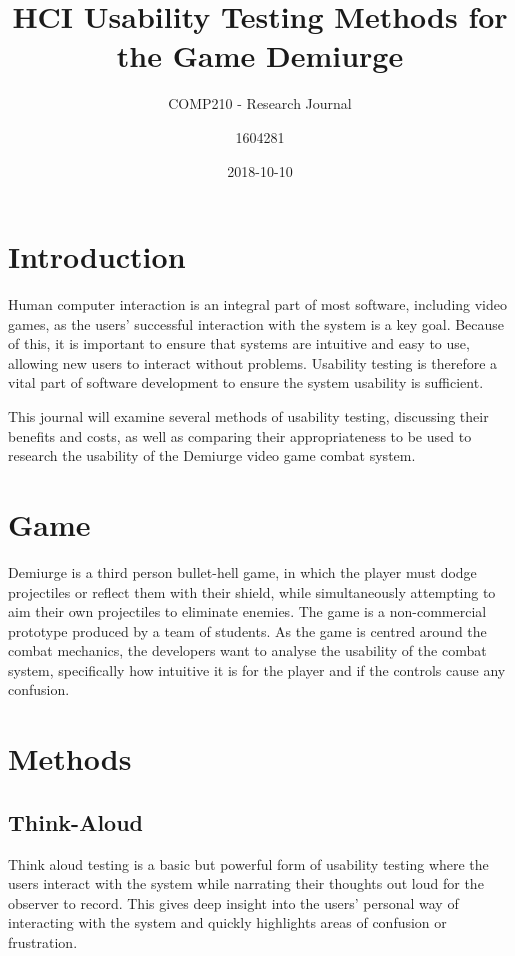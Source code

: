 \documentclass{scrartcl}
\title{HCI Usability Testing Methods for the Game Demiurge}
\subtitle{COMP210 - Research Journal}
\date{2018-10-10}
\author{1604281}
\begin{document}
\maketitle
{}


\section{Introduction}
Human computer interaction is an integral part of most software, including video games, as the users' successful interaction with the system is a key goal. Because of this, it is important to ensure that systems are intuitive and easy to use, allowing new users to interact without problems. Usability testing is therefore a vital part of software development to ensure the system usability is sufficient. 

This journal will examine several methods of usability testing, discussing their benefits and costs, as well as comparing their appropriateness to be used to research the usability of the Demiurge video game combat system.

\section{Game}
Demiurge is a third person bullet-hell game, in which the player must dodge projectiles or reflect them with their shield, while simultaneously attempting to aim their own projectiles to eliminate enemies. The game is a non-commercial prototype produced by a team of students. As the game is centred around the combat mechanics, the developers want to analyse the usability of the combat system, specifically how intuitive it is for the player and if the controls cause any confusion.


\section{Methods}

\subsection{Think-Aloud}
Think aloud testing is a basic but powerful form of usability testing where the users interact with the system while narrating their thoughts out loud for the observer to record. \cite{usabilityEngineering} This gives deep insight into the users' personal way of interacting with the system and quickly highlights areas of confusion or frustration.
\end{document}
